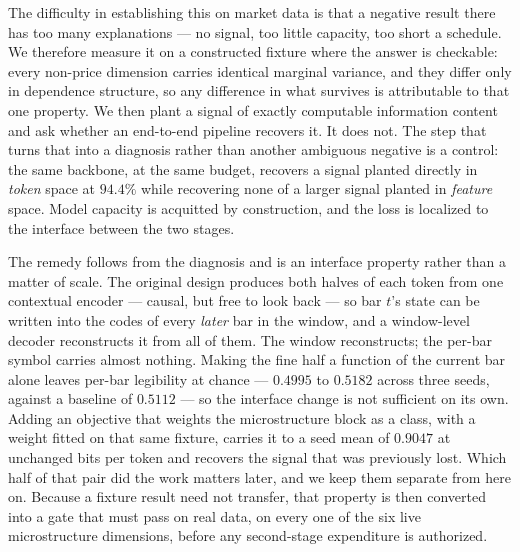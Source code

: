 The difficulty in establishing this on market data is that a negative result there has too many
explanations --- no signal, too little capacity, too short a schedule. We therefore measure it on a
constructed fixture where the answer is checkable: every non-price dimension carries identical
marginal variance, and they differ only in dependence structure, so any difference in what survives
is attributable to that one property. We then plant a signal of exactly computable information
content and ask whether an end-to-end pipeline recovers it. It does not. The step that turns that
into a diagnosis rather than another ambiguous negative is a control: the same backbone, at the
same budget, recovers a signal planted directly in \emph{token} space at $94.4\%$ while recovering
none of a larger signal planted in \emph{feature} space. Model capacity is acquitted by
construction, and the loss is localized to the interface between the two stages.

The remedy follows from the diagnosis and is an interface property rather than a matter of scale.
The original design produces both halves of each token from one contextual encoder --- causal, but
free to look back --- so bar $t$'s state can be written into the codes of every \emph{later} bar in
the window, and a window-level decoder reconstructs it from all of them. The window reconstructs;
the per-bar symbol carries almost nothing. Making the fine half a function of the current bar
alone leaves per-bar legibility at chance --- $0.4995$ to $0.5182$ across three seeds, against a
baseline of $0.5112$ --- so the interface change is not sufficient on its own. Adding an
objective that weights the microstructure block as a class, with a weight fitted on that same
fixture, carries it to a seed mean of $0.9047$ at unchanged bits per token and recovers the signal
that was previously lost. Which half of that pair did the work matters later, and we keep them
separate from here on. Because a fixture result need not
transfer, that property is then converted into a gate that must pass on real data, on every one of
the six live microstructure dimensions, before any second-stage expenditure is authorized.

